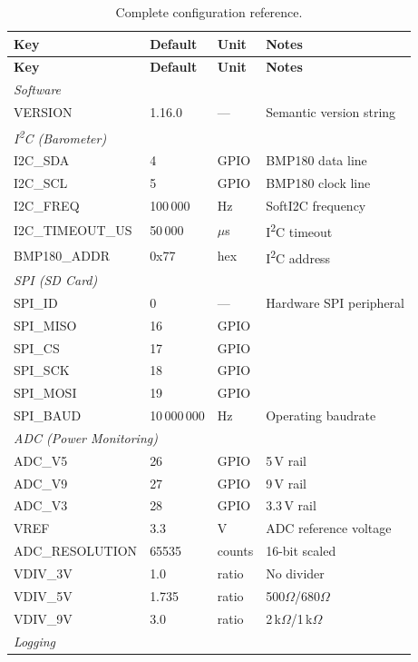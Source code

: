 \documentclass[11pt, a4paper, twoside]{article}
\begin{document}
\begin{longtable}{l l l p{5.5cm}}
\caption{Complete configuration reference.} \label{tab:config} \\
\toprule
\textbf{Key} & \textbf{Default} & \textbf{Unit} & \textbf{Notes} \\
\midrule
\endfirsthead
\toprule
\textbf{Key} & \textbf{Default} & \textbf{Unit} & \textbf{Notes} \\
\midrule
\endhead
\multicolumn{4}{l}{\textit{Software}} \\
VERSION & 1.16.0 & --- & Semantic version string \\
\midrule
\multicolumn{4}{l}{\textit{I\textsuperscript{2}C (Barometer)}} \\
I2C\_SDA & 4 & GPIO & BMP180 data line \\
I2C\_SCL & 5 & GPIO & BMP180 clock line \\
I2C\_FREQ & 100\,000 & Hz & SoftI2C frequency \\
I2C\_TIMEOUT\_US & 50\,000 & $\mu$s & I\textsuperscript{2}C timeout \\
BMP180\_ADDR & 0x77 & hex & I\textsuperscript{2}C address \\
\midrule
\multicolumn{4}{l}{\textit{SPI (SD Card)}} \\
SPI\_ID & 0 & --- & Hardware SPI peripheral \\
SPI\_MISO & 16 & GPIO & \\
SPI\_CS & 17 & GPIO & \\
SPI\_SCK & 18 & GPIO & \\
SPI\_MOSI & 19 & GPIO & \\
SPI\_BAUD & 10\,000\,000 & Hz & Operating baudrate \\
\midrule
\multicolumn{4}{l}{\textit{ADC (Power Monitoring)}} \\
ADC\_V5 & 26 & GPIO & 5\,V rail \\
ADC\_V9 & 27 & GPIO & 9\,V rail \\
ADC\_V3 & 28 & GPIO & 3.3\,V rail \\
VREF & 3.3 & V & ADC reference voltage \\
ADC\_RESOLUTION & 65535 & counts & 16-bit scaled \\
VDIV\_3V & 1.0 & ratio & No divider \\
VDIV\_5V & 1.735 & ratio & 500$\Omega$/680$\Omega$ \\
VDIV\_9V & 3.0 & ratio & 2\,k$\Omega$/1\,k$\Omega$ \\
\midrule
\multicolumn{4}{l}{\textit{Logging}} \\

\end{longtable}
\end{document}
